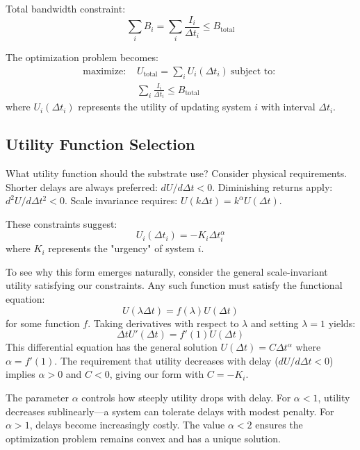 \documentclass[usenatbib]{mnras}
\begin{document}
Total bandwidth constraint:
\begin{equation}
\sum_i B_i = \sum_i \frac{I_i}{\Delta t_i} \leq B_{\text{total}}
\end{equation}

The optimization problem becomes:
\begin{align}
\text{maximize: } & U_{\text{total}} = \sum_i U_i(\Delta t_i) \
\text{subject to: }\\ & \sum_i \frac{I_i}{\Delta t_i} \leq B_{\text{total}}
\end{align}
where $U_i(\Delta t_i)$ represents the utility of updating system $i$ with interval $\Delta t_i$.

\subsection{Utility Function Selection}

What utility function should the substrate use? Consider physical requirements. Shorter delays are always preferred: $dU/d\Delta t < 0$. Diminishing returns apply: $d^2U/d\Delta t^2 < 0$. Scale invariance requires: $U(k\Delta t) = k^\alpha U(\Delta t)$.

These constraints suggest:
\begin{equation}
U_i(\Delta t_i) = -K_i \Delta t_i^\alpha
\end{equation}
where $K_i$ represents the "urgency" of system $i$.

To see why this form emerges naturally, consider the general scale-invariant utility satisfying our constraints. Any such function must satisfy the functional equation:
\begin{equation}
U(\lambda \Delta t) = f(\lambda) U(\Delta t)
\end{equation}
for some function $f$. Taking derivatives with respect to $\lambda$ and setting $\lambda = 1$ yields:
\begin{equation}
\Delta t U'(\Delta t) = f'(1) U(\Delta t)
\end{equation}
This differential equation has the general solution $U(\Delta t) = C \Delta t^{\alpha}$ where $\alpha = f'(1)$. The requirement that utility decreases with delay ($dU/d\Delta t < 0$) implies $\alpha > 0$ and $C < 0$, giving our form with $C = -K_i$.

The parameter $\alpha$ controls how steeply utility drops with delay. For $\alpha < 1$, utility decreases sublinearly---a system can tolerate delays with modest penalty. For $\alpha > 1$, delays become increasingly costly. The value $\alpha < 2$ ensures the optimization problem remains convex and has a unique solution.
\end{document}

